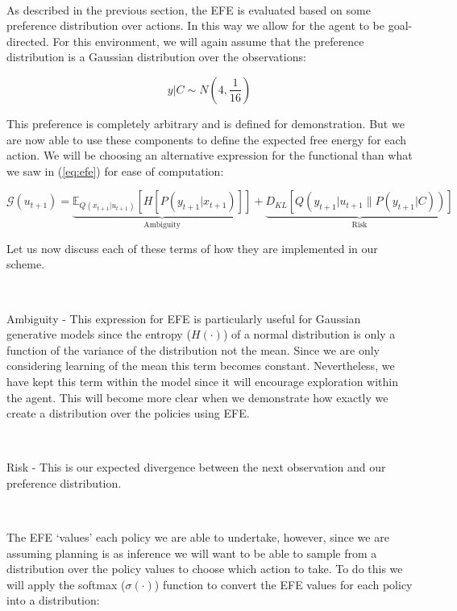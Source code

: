 \documentclass{article}
\newcommand{\refp}[1]{(\ref{#1})}
\begin{document}
\

As described in the previous section, the EFE is evaluated based on some preference distribution over actions. In this way we allow for the agent to be goal-directed. For this environment, we will again assume that the preference distribution is a Gaussian distribution over the observations:

\begin{equation}
	y | C \sim N(4, \frac{1}{16})
\end{equation}

This preference is completely arbitrary and is defined for demonstration. But we are now able to use these components to define the expected free energy for each action. We will be choosing an alternative expression for the functional than what we saw in \refp{eq:efe} for ease of computation:

\begin{equation}\label{eq:efe_thermostat}
	\mathcal{G}(u_{t+1}) = \underbrace{\mathbb{E}_{Q(x_{t+1} | u_{t+1})} \left[ H[ P(y_{t+1} | x_{t+1}) ] \right]}_{\text{Ambiguity}} + \underbrace{D_{KL}\left[ Q(y_{t+1} | u_{t+1} \| P(y_{t+1} | C)) \right]}_{\text{Risk}}
\end{equation}

Let us now discuss each of these terms of how they are implemented in our scheme.

\

Ambiguity - This expression for EFE is particularly useful for Gaussian generative models since the entropy ($H(\cdot)$) of a normal distribution is only a function of the variance of the distribution not the mean. Since we are only considering learning of the mean this term becomes constant. Nevertheless, we have kept this term within the model since it will encourage exploration within the agent. This will become more clear when we demonstrate how exactly we create a distribution over the policies using EFE.

\

Risk - This is our expected divergence between the next observation and our preference distribution.

\

The EFE `values' each policy we are able to undertake, however, since we are assuming planning is as inference we will want to be able to sample from a distribution over the policy values to choose which action to take. To do this we will apply the softmax ($\sigma(\cdot)$) function to convert the EFE values for each policy into a distribution:
\end{document}
